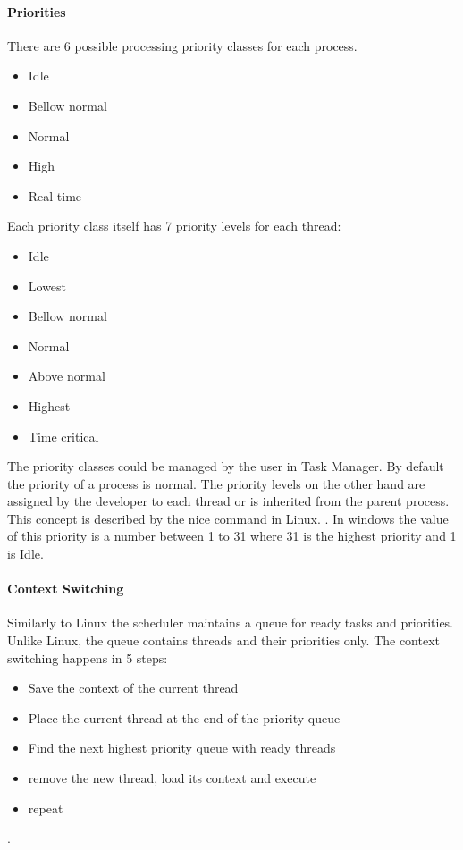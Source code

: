 \documentclass[journal,10pt,onecolumn,compsoc,letterpaper,draftclsnofoot,table,xcdraw]{IEEEtran} \usepackage[margin=0.75in]{geometry}
\begin{document}
\paragraph{Priorities} There are 6 possible processing priority classes for each process.
\begin{itemize}
\item Idle
\item Bellow normal
\item Normal
\item High
\item Real-time
\end{itemize}
\noindent Each priority class itself has 7 priority levels for each thread:
\begin{itemize}
\item Idle
\item Lowest
\item Bellow normal
\item Normal
\item Above normal
\item Highest
\item Time critical
\end{itemize}
\noindent The priority classes could be managed by the user in Task Manager. By default the priority of a process is normal. The priority levels on the other hand are assigned by the developer to each thread or is inherited from the parent process. This concept is described by the nice command in Linux. \cite{windowscpuscheduling}. In windows the value of this priority is a number between 1 to 31 where 31 is the highest priority and 1 is Idle.
\paragraph{Context Switching} Similarly to Linux the scheduler maintains a queue for ready tasks and priorities. Unlike Linux, the queue contains threads and their priorities only. The context switching happens in  5 steps:
\begin{itemize}
\item Save the context of the current thread
\item Place the current thread at the end of the priority queue
\item Find the next highest priority queue with ready threads
\item remove the new thread, load its context and execute
\item repeat
\end{itemize}
\cite{winconsw}.
\end{document}
